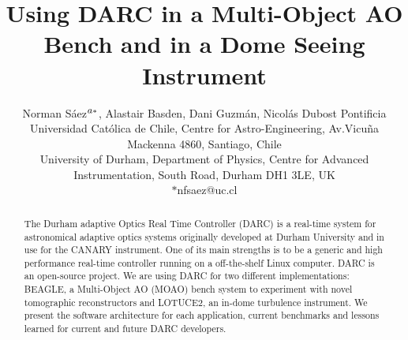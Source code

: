 \documentclass[]{spie}  %
\title{Using DARC in a Multi-Object AO Bench and in a Dome Seeing Instrument}
\author{Norman S\'aez$\supit{a}^{*}$, Alastair Basden\supit{b}, Dani Guzm\'an\supit{a}, Nicol\'as Dubost\supit{a}
\skiplinehalf
\supit{a}Pontificia Universidad Cat\'olica de Chile, Centre for Astro-Engineering, Av.Vicu\~na Mackenna 4860, Santiago, Chile\\
\supit{b}University of Durham, Department of Physics, Centre for Advanced Instrumentation, South Road, Durham DH1 3LE, UK\\ $*$nfsaez@uc.cl
}
\begin{document}
 
  \maketitle 

\begin{abstract}
The Durham adaptive Optics Real Time Controller (DARC)\cite{basden2010durham} is a real-time system
for astronomical adaptive optics systems originally developed at Durham
University and in use for the CANARY instrument. One of its main strengths is
to be a generic and high performance real-time controller running on a
off-the-shelf Linux computer. DARC is an open-source project. We are using DARC
for two different implementations: BEAGLE, a Multi-Object AO (MOAO) bench
system to experiment with novel tomographic reconstructors and LOTUCE2, an
in-dome turbulence instrument. We present the software architecture for each
application, current benchmarks and lessons learned for current and future DARC
developers.
\end{abstract}



\end{document}

